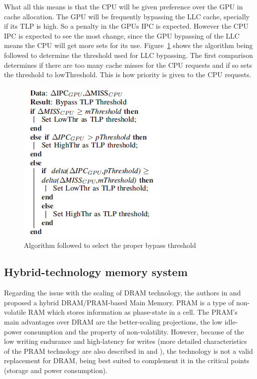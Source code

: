 \documentclass[12pt,journal,compsoc]{IEEEtran}
\begin{document}
What all this means is that the CPU will be given preference over the GPU in cache allocation. The GPU will be frequently bypassing the LLC cache, specially if its TLP is high. So a penalty in the GPUs IPC is expected. However the CPU IPC is expected to see the most change, since the GPU bypassing of the LLC means the CPU will get more sets for its use. Figure~\ref{fig:algo} shows the algorithm being followed to determine the threshold used for LLC bypassing. The first comparison determines if there are too many cache misses for the CPU requests and if so sets the threshold to lowThreshold. This is how priority is given to the CPU requests.

\begin{figure}
	\centering
	\includegraphics[width = 6 cm]{graphics/LLCalgo.png}
	\caption{Algorithm followed to select the proper bypass threshold\cite{LLC}}\label{fig:algo}
\end{figure} 

\subsection{Hybrid-technology memory system}
Regarding the issue with the scaling of DRAM technology, the authors in \cite{PDRAM} and \cite{PRAM} proposed a hybrid DRAM/PRAM-based Main Memory. PRAM is a type of non-volatile RAM which stores information as phase-state in a cell. The PRAM’s main advantages over DRAM  are the better-scaling projections, the low idle-power consumption and the property of non-volatility. However, because of the low writing endurance and high-latency for writes (more detailed characteristics of the PRAM technology are also described in \cite{PDRAM} and \cite{PRAM}), the technology is not a valid replacement for DRAM, being best suited to complement it in the critical points (storage and power consumption).
\end{document}
